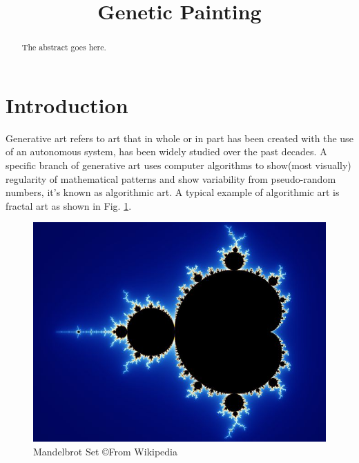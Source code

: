 \documentclass[a4paper,conference]{IEEEtran}
\begin{document}
\title{Genetic Painting}
\author{
  }
\maketitle

\begin{abstract}
  The abstract goes here.
\end{abstract}
\section{Introduction}
Generative art refers to art that in whole or in part has been created with the use of an autonomous system, has been widely studied over the past decades. A specific branch of generative art uses computer algorithms to show(most visually) regularity of mathematical patterns and show variability from pseudo-random numbers, it's known as algorithmic art. A typical example of algorithmic art is fractal art as shown in Fig. \ref{fig:fracal}.

\begin{figure}[htp]
  \centering
  \includegraphics[width=.8\columnwidth]{imgs/mandelbrot_set.jpg}
  \caption{Mandelbrot Set \copyright From Wikipedia}
  \label{fig:fracal}
\end{figure}
\end{document}
